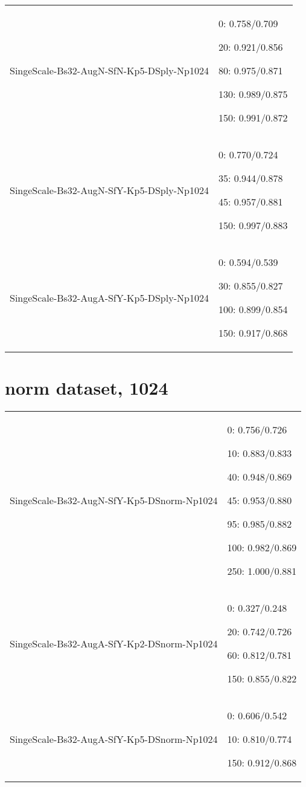 \documentclass[,table,dvipsnames]{article}
\begin{document}
\begin{tabular}{|p{10cm}|p{5.5cm}| }
\rowcolor{red!20}
SingeScale-Bs32-AugN-SfN-Kp5-DSply-Np1024 &
0: 0.758/0.709\par 20: 0.921/0.856\par 80: 0.975/0.871\par 130: 0.989/0.875\par 150: 0.991/0.872\\

\rowcolor{green!20}
SingeScale-Bs32-AugN-SfY-Kp5-DSply-Np1024& 
0: 0.770/0.724\par 35: 0.944/0.878\par 45: 0.957/0.881\par 150: 0.997/0.883 \\

 \rowcolor{red!20}
SingeScale-Bs32-AugA-SfY-Kp5-DSply-Np1024&
0: 0.594/0.539\par 30: 0.855/0.827\par  100: 0.899/0.854 \par 150: 0.917/0.868 \\
\hline 	
\end{tabular}



\section{norm dataset, 1024}
\noindent\begin{tabular}{|p{10cm}|p{5.5cm}| }	
\hline
\rowcolor{green!20}
SingeScale-Bs32-AugN-SfY-Kp5-DSnorm-Np1024&
0: 0.756/0.726\par 10: 0.883/0.833\par 40: 0.948/0.869\par 45: 0.953/0.880\par 95: 0.985/0.882\par 100: 0.982/0.869\par  250: 1.000/0.881\\

\rowcolor{red!20}
SingeScale-Bs32-AugA-SfY-Kp2-DSnorm-Np1024&
0: 0.327/0.248\par 20: 0.742/0.726\par 60: 0.812/0.781\par 150: 0.855/0.822\\

\rowcolor{green!20}
SingeScale-Bs32-AugA-SfY-Kp5-DSnorm-Np1024&
0: 0.606/0.542\par 10: 0.810/0.774\par 150: 0.912/0.868\\


 
\hline 	
\end{tabular}
\end{document}

